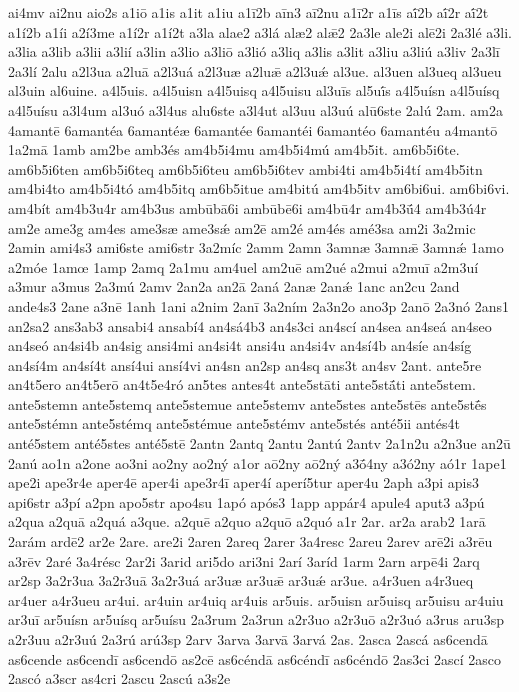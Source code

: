 {ai4mv
ai2nu
aio2s
a1iō
a1is
a1it
a1iu
a1ī2b
aīn3
aī2nu
a1ī2r
a1īs
aī́2b
aī́2r
aī́2t
a1í2b
a1íi
a2í3me
a1í2r
a1í2t
a3la
alae2
a3lá
alæ2
alǣ2
2a3le
ale2i
alē2i
2a3lé
a3li.
a3lia
a3lib
a3lii
a3lií
a3lin
a3lio
a3liō
a3lió
a3liq
a3lis
a3lit
a3liu
a3liú
a3liv
2a3lī
2a3lí
2alu
a2l3ua
a2luā
a2l3uá
a2l3uæ
a2luǣ
a2l3uǽ
al3ue.
al3uen
al3ueq
al3ueu
al3uin
al6uine.
a4l5uis.
a4l5uisn
a4l5uisq
a4l5uisu
al3uīs
al5uī́s
a4l5uísn
a4l5uísq
a4l5uísu
a3l4um
al3uó
a3l4us
alu6ste
a3l4ut
al3uu
al3uú
alū6ste
2alú
2am.
am2a
4amantē
6amantéa
6amantéæ
6amantée
6amantéi
6amantéo
6amantéu
a4mantō
1a2mā
1amb
am2be
amb3és
am4b5i4mu
am4b5i4mú
am4b5it.
am6b5i6te.
am6b5i6ten
am6b5i6teq
am6b5i6teu
am6b5i6tev
ambi4ti
am4b5i4tí
am4b5itn
am4bi4to
am4b5i4tó
am4b5itq
am6b5itue
am4bitú
am4b5itv
am6bi6ui.
am6bi6vi.
am4bít
am4b3u4r
am4b3us
ambūbā6i
ambūbē6i
am4bū4r
am4b3ū́4
am4b3ú4r
am2e
ame3g
am4es
ame3sæ
ame3sǽ
am2ē
am2é
am4és
amé3sa
am2i
3a2mic
2amin
ami4s3
ami6ste
ami6str
3a2míc
2amm
2amn
3amnæ
3amnǣ
3amnǽ
1amo
a2móe
1amœ
1amp
2amq
2a1mu
am4uel
am2uē
am2ué
a2mui
a2muī
a2m3uí
a3mur
a3mus
2a3mú
2amv
2an2a
an2ā
2aná
2anæ
2anǽ
1anc
an2cu
2and
ande4s3
2ane
a3nē
1anh
1ani
a2nim
2anī
3a2ním
2a3n2o
ano3p
2anō
2a3nó
2ans1
an2sa2
ans3ab3
ansabi4
ansabí4
an4sá4b3
an4s3ci
an4scí
an4sea
an4seá
an4seo
an4seó
an4si4b
an4sig
ansi4mi
an4si4t
ansi4u
an4si4v
an4sí4b
an4síe
an4síg
an4sí4m
an4sí4t
ansí4ui
ansí4vi
an4sn
an2sp
an4sq
ans3t
an4sv
2ant.
ante5re
an4t5ero
an4t5erō
an4t5e4ró
an5tes
antes4t
ante5stāti
ante5stā́ti
ante5stem.
ante5stemn
ante5stemq
ante5stemue
ante5stemv
ante5stes
ante5stēs
ante5stḗs
ante5stémn
ante5stémq
ante5stémue
ante5stémv
ante5stés
anté5ii
antés4t
anté5stem
anté5stes
anté5stē
2antn
2antq
2antu
2antú
2antv
2a1n2u
a2n3ue
an2ū
2anú
ao1n
a2one
ao3ni
ao2ny
ao2ný
a1or
aō2ny
aō2ný
a3ṓ4ny
a3ó2ny
aó1r
1ape1
ape2i
ape3r4e
aper4ē
aper4i
ape3r4ī
aper4í
aperí5tur
aper4u
2aph
a3pi
apis3
api6str
a3pí
a2pn
apo5str
apo4su
1apó
após3
1app
appár4
apule4
aput3
a3pú
a2qua
a2quā
a2quá
a3que.
a2quē
a2quo
a2quō
a2quó
a1r
2ar.
ar2a
arab2
1arā
2arám
ardē2
ar2e
2are.
are2i
2aren
2areq
2arer
3a4resc
2areu
2arev
arē2i
a3rēu
a3rēv
2aré
3a4résc
2ar2i
3arid
ari5do
ari3ni
2arí
3aríd
1arm
2arn
arpē4i
2arq
ar2sp
3a2r3ua
3a2r3uā
3a2r3uá
ar3uæ
ar3uǣ
ar3uǽ
ar3ue.
a4r3uen
a4r3ueq
ar4uer
a4r3ueu
ar4ui.
ar4uin
ar4uiq
ar4uis
ar5uis.
ar5uisn
ar5uisq
ar5uisu
ar4uiu
ar3uī
ar5uísn
ar5uísq
ar5uísu
2a3rum
2a3run
a2r3uo
a2r3uō
a2r3uó
a3rus
aru3sp
a2r3uu
a2r3uú
2a3rú
arú3sp
2arv
3arva
3arvā
3arvá
2as.
2asca
2ascá
as6cendā
as6cende
as6cendī
as6cendō
as2cē
as6céndā
as6céndī
as6céndō
2as3ci
2ascí
2asco
2ascó
a3scr
as4cri
2ascu
2ascú
a3s2e
}
